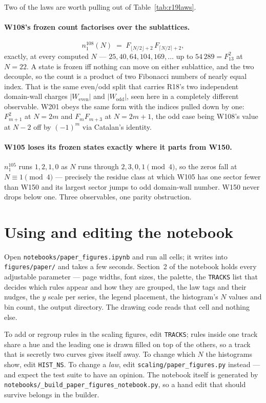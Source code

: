 \documentclass[11pt]{article}
\newcommand{\rt}[1]{\texttt{#1}}
\newcommand{\fn}[1]{\texttt{#1}}
\begin{document}
Two of the laws are worth pulling out of Table~\ref{tab:r19laws}.

\paragraph{W108's frozen count factorises over the sublattices.}
\[
  n_1^{108}(N) \;=\; F_{\lfloor N/2\rfloor+2}\, F_{\lceil N/2\rceil+2},
\]
exactly, at every computed $N$ --- $25, 40, 64, 104, 169, \ldots$ up to
$54\,289 = F_{13}^2$ at $N = 22$. A state is frozen iff nothing can move on either
sublattice, and the two decouple, so the count is a product of two Fibonacci
numbers of nearly equal index. That is the same even/odd split that carries R18's
two independent domain-wall charges $|W_{\mathrm{even}}|$ and
$|W_{\mathrm{odd}}|$, seen here in a completely different observable. W201 obeys
the same form with the indices pulled down by one: $F_{m+1}^2$ at $N=2m$ and
$F_m F_{m+3}$ at $N = 2m+1$, the odd case being W108's value at $N-2$ off by
$(-1)^m$ via Catalan's identity.

\paragraph{W105 loses its frozen states exactly where it parts from W150.}
$n_1^{105}$ runs $1, 2, 1, 0$ as $N$ runs through $2, 3, 0, 1 \pmod 4$, so the
zeros fall at $N \equiv 1 \pmod 4$ --- precisely the residue class at which W105
has one sector fewer than W150 and its largest sector jumps to odd domain-wall
number. W150 never drops below one. Three observables, one parity obstruction.

\section{Using and editing the notebook}

Open \fn{notebooks/paper\_figures.ipynb} and run all cells; it writes into
\fn{figures/paper/} and takes a few seconds. Section~2 of the notebook holds
every adjustable parameter --- page widths, font sizes, the palette, the
\rt{TRACKS} list that decides which rules appear and how they are grouped, the
law tags and their nudges, the $y$ scale per series, the legend placement, the
histogram's $N$ values and bin count, the output directory. The drawing code
reads that cell and nothing else.

To add or regroup rules in the scaling figures, edit \rt{TRACKS}; rules inside
one track share a hue and the leading one is drawn filled on top of the others,
so a track that is secretly two curves gives itself away. To change which $N$ the
histograms show, edit \rt{HIST\_NS}. To change a \emph{law}, edit
\fn{scaling/paper\_figures.py} instead --- and expect the test suite to have an
opinion. The notebook itself is generated by
\fn{notebooks/\_build\_paper\_figures\_notebook.py}, so a hand edit that should
survive belongs in the builder.
\end{document}
